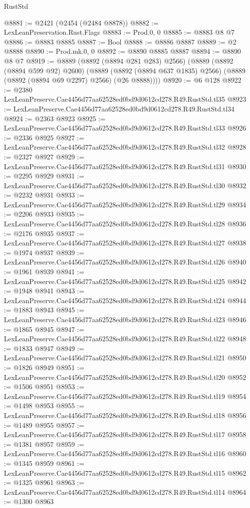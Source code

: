 \begin{lexlean}{RustStd}
\begin{coremodule}
@8881 := @2421 (@2454 (@2484 @8878))
@8882 := LexLeanPreservation.Rust.Flags
@8883 := Prod.{0, 0}
@8885 := @8883 @8 @7
@8886 := @8883 @8885
@8887 := Bool
@8888 := @8886 @8887
@8889 := @2 @8888
@8890 := Prod.mk.{0, 0}
@8892 := @8890 @8885 @8887
@8894 := @8890 @8 @7
@8919 := @8889
    (@8892 (@8894 @281 @283) @2566)
    (@8889
      (@8892 (@8894 @599 @92) @2600)
      (@8889 (@8892 (@8894 @637 @1835) @2566) (@8889 (@8892 (@8894 @69 @2297) @2566) (@26 @8888))))
@8920 := @6 @128
@8922 := @2380 LexLeanPreserve.Cae4456d77aa62528ed0bd9d0612cd278.R49.RustStd.tl35
@8923 := LexLeanPreserve.Cae4456d77aa62528ed0bd9d0612cd278.R49.RustStd.tl34
@8924 := @2363 @8923
@8925 := LexLeanPreserve.Cae4456d77aa62528ed0bd9d0612cd278.R49.RustStd.tl33
@8926 := @2336 @8925
@8927 := LexLeanPreserve.Cae4456d77aa62528ed0bd9d0612cd278.R49.RustStd.tl32
@8928 := @2327 @8927
@8929 := LexLeanPreserve.Cae4456d77aa62528ed0bd9d0612cd278.R49.RustStd.tl31
@8930 := @2295 @8929
@8931 := LexLeanPreserve.Cae4456d77aa62528ed0bd9d0612cd278.R49.RustStd.tl30
@8932 := @2232 @8931
@8933 := LexLeanPreserve.Cae4456d77aa62528ed0bd9d0612cd278.R49.RustStd.tl29
@8934 := @2206 @8933
@8935 := LexLeanPreserve.Cae4456d77aa62528ed0bd9d0612cd278.R49.RustStd.tl28
@8936 := @2176 @8935
@8937 := LexLeanPreserve.Cae4456d77aa62528ed0bd9d0612cd278.R49.RustStd.tl27
@8938 := @1974 @8937
@8939 := LexLeanPreserve.Cae4456d77aa62528ed0bd9d0612cd278.R49.RustStd.tl26
@8940 := @1961 @8939
@8941 := LexLeanPreserve.Cae4456d77aa62528ed0bd9d0612cd278.R49.RustStd.tl25
@8942 := @1948 @8941
@8943 := LexLeanPreserve.Cae4456d77aa62528ed0bd9d0612cd278.R49.RustStd.tl24
@8944 := @1883 @8943
@8945 := LexLeanPreserve.Cae4456d77aa62528ed0bd9d0612cd278.R49.RustStd.tl23
@8946 := @1865 @8945
@8947 := LexLeanPreserve.Cae4456d77aa62528ed0bd9d0612cd278.R49.RustStd.tl22
@8948 := @1833 @8947
@8949 := LexLeanPreserve.Cae4456d77aa62528ed0bd9d0612cd278.R49.RustStd.tl21
@8950 := @1826 @8949
@8951 := LexLeanPreserve.Cae4456d77aa62528ed0bd9d0612cd278.R49.RustStd.tl20
@8952 := @1506 @8951
@8953 := LexLeanPreserve.Cae4456d77aa62528ed0bd9d0612cd278.R49.RustStd.tl19
@8954 := @1498 @8953
@8955 := LexLeanPreserve.Cae4456d77aa62528ed0bd9d0612cd278.R49.RustStd.tl18
@8956 := @1489 @8955
@8957 := LexLeanPreserve.Cae4456d77aa62528ed0bd9d0612cd278.R49.RustStd.tl17
@8958 := @1381 @8957
@8959 := LexLeanPreserve.Cae4456d77aa62528ed0bd9d0612cd278.R49.RustStd.tl16
@8960 := @1345 @8959
@8961 := LexLeanPreserve.Cae4456d77aa62528ed0bd9d0612cd278.R49.RustStd.tl15
@8962 := @1325 @8961
@8963 := LexLeanPreserve.Cae4456d77aa62528ed0bd9d0612cd278.R49.RustStd.tl14
@8964 := @1300 @8963

\end{coremodule}
\end{lexlean}
